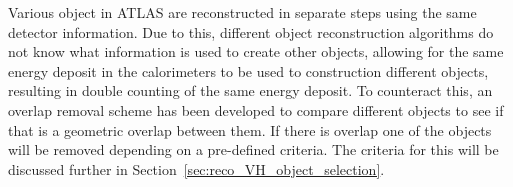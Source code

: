 Various object in ATLAS are reconstructed in separate steps using the same detector information. Due to this, different object reconstruction algorithms do not know what information is used to create other objects, allowing for the same energy deposit in the calorimeters to be used to construction different objects, resulting in double counting of the same energy deposit. To counteract this, an overlap removal scheme has been developed to compare different objects to see if that is a geometric overlap between them. If there is overlap one of the objects will be removed depending on a pre-defined criteria. The criteria for this will be discussed further in Section~\ref{sec:reco_VH_object_selection}.